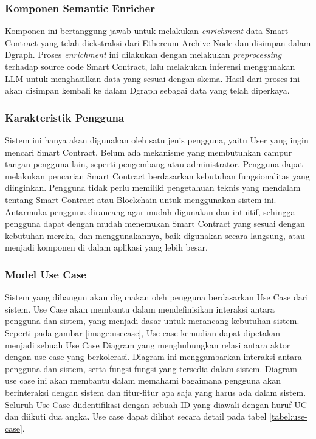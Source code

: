\subsubsection{Komponen Semantic Enricher}

Komponen ini bertanggung jawab untuk melakukan \textit{enrichment} data Smart Contract yang telah diekstraksi dari Ethereum Archive Node dan disimpan dalam Dgraph. Proses \textit{enrichment} ini dilakukan dengan melakukan \textit{preprocessing} terhadap source code Smart Contract, lalu melakukan inferensi menggunakan LLM untuk menghasilkan data yang sesuai dengan skema. Hasil dari proses ini akan disimpan kembali ke dalam Dgraph sebagai data yang telah diperkaya.

\subsubsection{Karakteristik Pengguna}

Sistem ini hanya akan digunakan oleh satu jenis pengguna, yaitu User yang ingin mencari Smart Contract. Belum ada mekanisme yang membutuhkan campur tangan pengguna lain, seperti pengembang atau administrator. Pengguna dapat melakukan pencarian Smart Contract berdasarkan kebutuhan fungsionalitas yang diinginkan. Pengguna tidak perlu memiliki pengetahuan teknis yang mendalam tentang Smart Contract atau Blockchain untuk menggunakan sistem ini. Antarmuka pengguna dirancang agar mudah digunakan dan intuitif, sehingga pengguna dapat dengan mudah menemukan Smart Contract yang sesuai dengan kebutuhan mereka, dan menggunakannya, baik digunakan secara langsung, atau menjadi komponen di dalam aplikasi yang lebih besar.

\subsubsection{Model Use Case}

Sistem yang dibangun akan digunakan oleh pengguna berdasarkan Use Case dari sistem. Use Case akan membantu dalam mendefinisikan interaksi antara pengguna dan sistem, yang menjadi dasar untuk merancang kebutuhan sistem. Seperti pada gambar \ref{image:usecase}, Use case kemudian dapat dipetakan menjadi sebuah Use Case Diagram yang menghubungkan relasi antara aktor dengan use case yang berkolerasi. Diagram ini menggambarkan interaksi antara pengguna dan sistem, serta fungsi-fungsi yang tersedia dalam sistem. Diagram use case ini akan membantu dalam memahami bagaimana pengguna akan berinteraksi dengan sistem dan fitur-fitur apa saja yang harus ada dalam sistem. Seluruh Use Case diidentifikasi dengan sebuah ID yang diawali dengan huruf UC dan diikuti dua angka. Use case dapat dilihat secara detail pada tabel \ref{tabel:use-case}.


